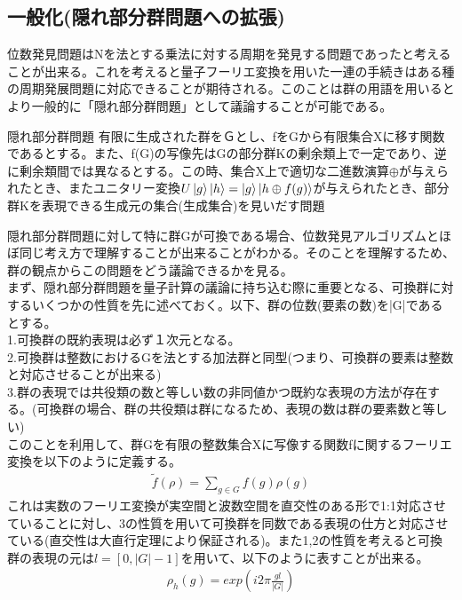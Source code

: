 \documentclass[a4paper,10.5pt]{article}
\numberwithin{equation}{section}
\begin{document}
\subsection{一般化(隠れ部分群問題への拡張)}
位数発見問題はNを法とする乗法に対する周期を発見する問題であったと考えることが出来る。これを考えると量子フーリエ変換を用いた一連の手続きはある種の周期発展問題に対応できることが期待される。このことは群の用語を用いるとより一般的に「隠れ部分群問題」として議論することが可能である。
\begin{itembox}[l]{隠れ部分群問題}
有限に生成された群をＧとし、fをGから有限集合Xに移す関数であるとする。また、f(G)の写像先はGの部分群Kの剰余類上で一定であり、逆に剰余類間では異なるとする。この時、集合X上で適切な二進数演算$\oplus$が与えられたとき、またユニタリー変換$U\ket{g}\ket{h}=\ket{g}\ket{h\oplus f(g)}$が与えられたとき、部分群Kを表現できる生成元の集合(生成集合)を見いだす問題
\end{itembox}
隠れ部分群問題に対して特に群Gが可換である場合、位数発見アルゴリズムとほぼ同じ考え方で理解することが出来ることがわかる。そのことを理解するため、群の観点からこの問題をどう議論できるかを見る。\\
まず、隠れ部分群問題を量子計算の議論に持ち込む際に重要となる、可換群に対するいくつかの性質を先に述べておく。以下、群の位数(要素の数)を|G|であるとする。\\
1.可換群の既約表現は必ず１次元となる。\\
2.可換群は整数におけるGを法とする加法群と同型(つまり、可換群の要素は整数と対応させることが出来る)\\
3.群の表現では共役類の数と等しい数の非同値かつ既約な表現の方法が存在する。(可換群の場合、群の共役類は群になるため、表現の数は群の要素数と等しい)\\
このことを利用して、群Gを有限の整数集合Xに写像する関数fに関するフーリエ変換を以下のように定義する。
\begin{equation}\begin{split}
    \tilde{f}(\rho) = \sum_{g \in G} f(g) \rho (g)
\end{split} \end{equation}
これは実数のフーリエ変換が実空間と波数空間を直交性のある形で1:1対応させていることに対し、3の性質を用いて可換群を同数である表現の仕方と対応させている(直交性は大直行定理により保証される)。また1,2の性質を考えると可換群の表現の元は$l=[0,|G|-1]$を用いて、以下のように表すことが出来る。
\begin{equation}\begin{split}
    \rho_{h} (g) = exp(i2 \pi \frac{gl}{|G|})
\end{split} \end{equation}
\end{document}
